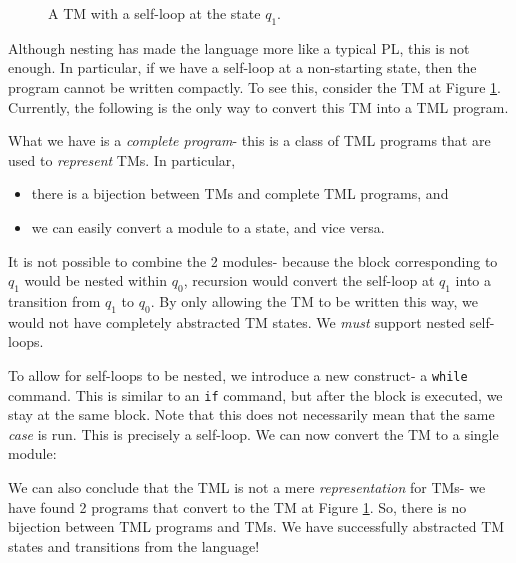 \begin{figure}[htb]
    \centering
    \caption{A TM with a self-loop at the state $q_1$.}
    \label{fig:self-loop-TM}
\end{figure}
Although nesting has made the language more like a typical PL, this is not enough. In particular, if we have a self-loop at a non-starting state, then the program cannot be written compactly. To see this, consider the TM at Figure \ref{fig:self-loop-TM}. Currently, the following is the only way to convert this TM into a TML program.

What we have is a \emph{complete program}- this is a class of TML programs that are used to \textit{represent} TMs. In particular, 
\begin{itemize}
    \item there is a bijection between TMs and complete TML programs, and
    \item we can easily convert a module to a state, and vice versa.
\end{itemize}
It is not possible to combine the 2 modules- because the block corresponding to $q_1$ would be nested within $q_0$, recursion would convert the self-loop at $q_1$ into a transition from $q_1$ to $q_0$. By only allowing the TM to be written this way, we would not have completely abstracted TM states. We \textit{must} support nested self-loops.

To allow for self-loops to be nested, we introduce a new construct- a \texttt{while} command. This is similar to an \texttt{if} command, but after the block is executed, we stay at the same block. Note that this does not necessarily mean that the same \textit{case} is run. This is precisely a self-loop. We can now convert the TM to a single module:

We can also conclude that the TML is not a mere \textit{representation} for TMs- we have found 2 programs that convert to the TM at Figure \ref{fig:self-loop-TM}. So, there is no bijection between TML programs and TMs. We have successfully abstracted TM states and transitions from the language!

